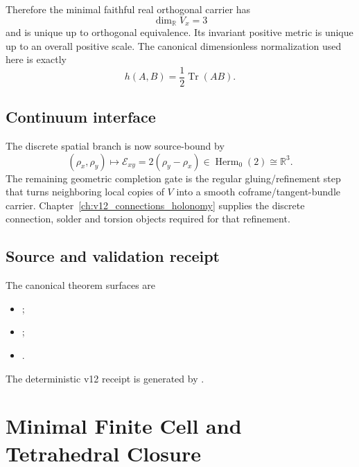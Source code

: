 Therefore the minimal faithful real orthogonal carrier has
\[
\boxed{\dim_{\mathbb R}V_x=3}
\]
and is unique up to orthogonal equivalence.  Its invariant positive metric is
unique up to an overall positive scale.  The canonical dimensionless
normalization used here is exactly
\[
h(A,B)=\frac12\operatorname{Tr}(AB).
\]

\section{Continuum interface}

The discrete spatial branch is now source-bound by
\[
\boxed{
(\rho_x,\rho_y)
\longmapsto
\mathcal E_{xy}=2(\rho_y-\rho_x)
\in\operatorname{Herm}_0(2)\cong\mathbb R^3.
}
\]
The remaining geometric completion gate is the regular gluing/refinement step
that turns neighboring local copies of \(V\) into a smooth coframe/tangent-bundle
carrier.  Chapter~\ref{ch:v12_connections_holonomy} supplies the discrete
connection, solder and torsion objects required for that refinement.

\section{Source and validation receipt}

The canonical theorem surfaces are
\begin{itemize}
\item {};
\item {};
\item {}.
\end{itemize}

The deterministic v12 receipt is generated by
.

\clearpage

\chapter{Minimal Finite Cell and Tetrahedral Closure}
\label{ch:v12_tetrahedral_closure}

